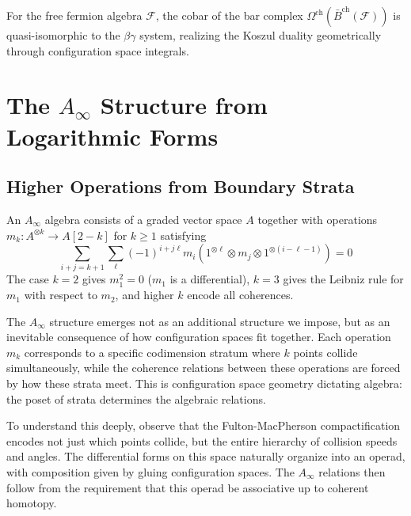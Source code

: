 \begin{example}
For the free fermion algebra $\mathcal{F}$, the cobar of the bar complex $\Omega^{\text{ch}}(\bar{B}^{\text{ch}}(\mathcal{F}))$ is quasi-isomorphic to the $\beta\gamma$ system, realizing the Koszul duality geometrically through configuration space integrals.
\end{example}
 
\section{The $A_\infty$ Structure from Logarithmic Forms}
 
\subsection{Higher Operations from Boundary Strata}

\begin{definition}\label{def:a-infinity}
An $A_\infty$ algebra consists of a graded vector space $A$
together with operations $m_k: A^{\otimes k} \to A[2-k]$ for $k \geq 1$ satisfying
\[\sum_{i+j=k+1} \sum_{\ell} (-1)^{i+j\ell} m_i(1^{\otimes \ell} \otimes m_j \otimes 1^{\otimes(i-\ell-1)}) = 0\]
The case $k=2$ gives $m_1^2 = 0$ ($m_1$ is a differential), $k=3$ gives the Leibniz rule for $m_1$ with
respect to $m_2$, and higher $k$ encode all coherences.
\end{definition}


\begin{remark}
The $A_\infty$ structure emerges not as an additional structure we impose, but as an inevitable consequence of how configuration spaces fit together. Each operation $m_k$ corresponds to a specific codimension stratum where $k$ points collide simultaneously, while the coherence relations between these operations are forced by how these strata meet. This is configuration space geometry dictating algebra: the poset of strata determines the algebraic relations.

To understand this deeply, observe that the Fulton-MacPherson compactification encodes not just which points collide, but the entire hierarchy of collision speeds and angles. The differential forms on this space naturally organize into an operad, with composition given by gluing configuration spaces. The $A_\infty$ relations then follow from the requirement that this operad be associative up to coherent homotopy.
\end{remark}


